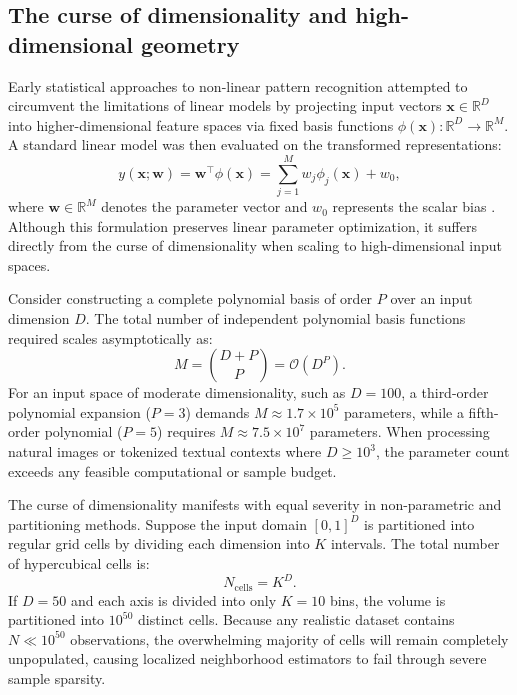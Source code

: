 \documentclass[../../../main.tex]{subfiles}
\begin{document}
\subsection{The curse of dimensionality and high-dimensional geometry}
\label{subsec:curse_of_dimensionality}

Early statistical approaches to non-linear pattern recognition attempted to circumvent the limitations of linear models by projecting input vectors $\mathbf{x} \in \mathbb{R}^D$ into higher-dimensional feature spaces via fixed basis functions $\phi(\mathbf{x}): \mathbb{R}^D \to \mathbb{R}^M$. A standard linear model was then evaluated on the transformed representations:
\begin{equation}
y(\mathbf{x}; \mathbf{w}) = \mathbf{w}^\top \phi(\mathbf{x}) = \sum_{j=1}^M w_j \phi_j(\mathbf{x}) + w_0,
\end{equation}
where $\mathbf{w} \in \mathbb{R}^M$ denotes the parameter vector and $w_0$ represents the scalar bias \citep{bishop2024deep}. Although this formulation preserves linear parameter optimization, it suffers directly from the curse of dimensionality when scaling to high-dimensional input spaces.

Consider constructing a complete polynomial basis of order $P$ over an input dimension $D$. The total number of independent polynomial basis functions required scales asymptotically as:
\begin{equation}
M = \binom{D + P}{P} = \mathcal{O}\left(D^P\right).
\end{equation}
For an input space of moderate dimensionality, such as $D = 100$, a third-order polynomial expansion ($P = 3$) demands $M \approx 1.7 \times 10^5$ parameters, while a fifth-order polynomial ($P = 5$) requires $M \approx 7.5 \times 10^7$ parameters. When processing natural images or tokenized textual contexts where $D \ge 10^3$, the parameter count exceeds any feasible computational or sample budget.

The curse of dimensionality manifests with equal severity in non-parametric and partitioning methods. Suppose the input domain $[0, 1]^D$ is partitioned into regular grid cells by dividing each dimension into $K$ intervals. The total number of hypercubical cells is:
\begin{equation}
N_{\text{cells}} = K^D.
\end{equation}
If $D = 50$ and each axis is divided into only $K = 10$ bins, the volume is partitioned into $10^{50}$ distinct cells. Because any realistic dataset contains $N \ll 10^{50}$ observations, the overwhelming majority of cells will remain completely unpopulated, causing localized neighborhood estimators to fail through severe sample sparsity.
\end{document}
